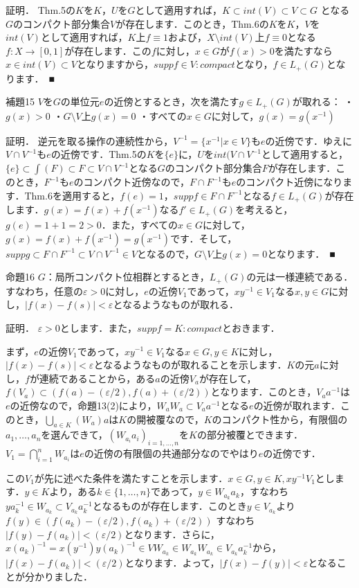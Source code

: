 証明．
Thm.5の$K$を$K$，$U$を$G$として適用すれば，$K \subset int(V) \subset V \subset G$ となる$G$のコンパクト部分集合$V$が存在します．このとき，Thm.6の$K$を$K$，$V$を$int(V)$として適用すれば，$K$上$f \equiv 1$および，$X \setminus int(V)$上$f \equiv 0$となる$f \colon X \to [0, 1]$が存在します．この$f$に対し，$x \in G$が$f(x)>0$を満たすなら$x \in int(V) \subset V$となりますから，$supp f \in V \colon compact$となり，$f \in L_{+}(G)$となります．　■

補題15
$V$を$G$の単位元$e$の近傍とするとき，次を満たす$g \in L_{+}(G)$が取れる：
・$g(x)>0$
・$G \setminus V$上$g(x)=0$
・すべての$x \in G$に対して，$g(x)=g(x^{-1})$

証明．
逆元を取る操作の連続性から，$V^{-1}=\{ x^{-1} | x \in V \}$も$e$の近傍です．ゆえに$V \cap V^{-1}$も$e$の近傍です．Thm.5の$K$を$\{e\}$に，$U$を$int(V \cap V^{-1}$として適用すると，$\{e\} \subset \int(F) \subset F \subset V \cap V^{-1}$となる$G$のコンパクト部分集合$F$が存在します．このとき，$F^{-1}$も$e$のコンパクト近傍なので，$F \cap F^{-1}$も$e$のコンパクト近傍になります．Thm.6を適用すると，$f(e)=1$，$supp f \in F \cap F^{-1}$となる$f \in L_{+}(G)$が存在します．$g(x)=f(x)+f(x^{-1})$なる$f' \in L_{+}(G)$を考えると，$g(e)=1+1=2>0$．また，すべての$x \in G$に対して，$g(x)=f(x)+f(x^{-1})=g(x^{-1})$です．そして，$supp g \subset F \cap F^{-1} \subset V \cap V^{-1} \in V$となるので，$G \setminus V$上$g(x)=0$となります．　■

命題16
$G$：局所コンパクト位相群とするとき，$L_{+}(G)$の元は一様連続である．すなわち，任意の$\varepsilon>0$に対し，$e$の近傍$V_1$であって，$xy^{-1} \in V_1$なる$x,y \in G$に対し，$|f(x)-f(s)|<\varepsilon$となるようなものが取れる．

証明．
$\varepsilon>0$とします．また，$supp f=K \colon compact$とおきます．

まず，$e$の近傍$V_1$であって，$xy^{-1} \in V_1$なる$x \in G, y \in K$に対し，$|f(x)-f(s)|<\varepsilon$となるようなものが取れることを示します．$K$の元$a$に対し，$f$が連続であることから，ある$a$の近傍$V_a$が存在して，$f(V_a) \subset (f(a)-(\varepsilon /2), f(a)+(\varepsilon /2) )$となります．このとき，$V_{a}a^{-1}$は$e$の近傍なので，命題13(2)により，$W_{a}W_{a} \subset V_{a}a^{-1}$となる$e$の近傍が取れます．このとき，$\bigcup_{a \in K}(W_a)a$は$K$の開被覆なので，$K$のコンパクト性から，有限個の$a_1, \ldots, a_n$を選んできて，$( W_{a_i}a_{i} )_{i=1,\ldots,n}$を$K$の部分被覆とできます．$V_1=\bigcap_{i=1}^{n}W_{a_i}$は$e$の近傍の有限個の共通部分なのでやはり$e$の近傍です．

この$V_1$が先に述べた条件を満たすことを示します．$x \in G, y \in K, xy^{-1} V_1$とします．$y \in K$より，ある$k \in \{1, \ldots , n \}$であって，$y \in W_{a_k}a_{k}$，すなわち$ya_{k}^{-1} \in W_{a_k} \subset V_{a_k}a_{k}^{-1}$となるものが存在します．このとき$y \in V_{a_k}$より$f(y) \in (f(a_k)-(\varepsilon/2), f(a_k)+(\varepsilon /2) )$ すなわち $|f(y)-f(a_k)|<(\varepsilon /2)$となります．さらに，$x(a_k)^{-1}=x(y^{-1})y(a_k)^{-1} \in VW_{a_k} \in W_{a_k}W_{a_k} \in V_{a_k}a_{k}^{-1}$から，$|f(x)-f(a_k)|<(\varepsilon /2)$となります．よって，$|f(x)-f(y)|<\varepsilon$となることが分かりました．

